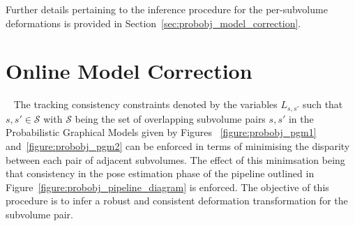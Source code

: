 Further details pertaining to the inference procedure for the per-subvolume
deformations is provided in Section~\ref{sec:probobj_model_correction}.

\section{Online Model Correction}
~\label{sec:probobj_model_correction}
The tracking consistency constraints denoted by the variables \(L_{s, s'}\) such
that \(s, s' \in \mathcal{S}\) with \(\mathcal{S}\) being the set of overlapping
subvolume pairs \(s, s'\) in the Probabilistic Graphical Models given by Figures
~\ref{figure:probobj_pgm1} and~\ref{figure:probobj_pgm2} can be enforced in terms of
minimising the disparity between each pair of adjacent subvolumes. The effect of
this minimsation being that consistency in the pose estimation phase of the
pipeline outlined in Figure~\ref{figure:probobj_pipeline_diagram} is enforced. The
objective of this procedure is to infer a robust and consistent deformation
transformation for the subvolume pair.

